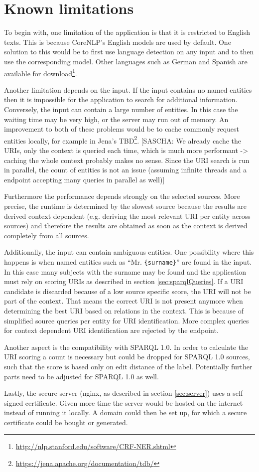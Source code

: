 \section{Known limitations}
\label{sec:Limits}
To begin with, one limitation of the application is that it is restricted to English texts. This is because CoreNLP's English models are used by default. One solution to this would be to first use language detection on any input and to then use the corresponding model. Other languages such as German and Spanish are available for download\footnote{\url{http://nlp.stanford.edu/software/CRF-NER.shtml}}. 

Another limitation depends on the input. If the input contains no named entities then it is impossible for the application to search for additional information. Conversely, the input can contain a large number of entities. In this case the waiting time may be very high, or the server may run out of memory. An improvement to both of these problems would be to cache commonly request entities locally, for example in Jena's TBD\footnote{\url{https://jena.apache.org/documentation/tdb/}}. [SASCHA: We already cache the URIs, only the context is queried each time, which is much more performant -> caching the whole context probably makes no sense. Since the URI search is run in parallel, the count of entities is not an issue (assuming infinite threads and a endpoint accepting many queries in parallel as well)]  

Furthermore the performance depends strongly on the selected sources. More precise, the runtime is determined by the slowest source because the results are derived context dependent (e.g. deriving the most relevant URI per entity across sources) and therefore the results are obtained as soon as the context is derived completely from all sources. 

Additionally, the input can contain ambiguous entities. One possibility where this happens is when named entities such as ``Mr. \texttt{\{surname\}}'' are found in the input. In this case many subjects with the surname may be found and the application must rely on scoring URIs as described in section \ref{sec:sparqlQueries}. If a URI candidate is discarded because of a low source specific score, the URI will not be part of the context. That means the correct URI is not present anymore when determining the best URI based on relations in the context. This is because of simplified source queries per entity for URI identification. More complex queries for context dependent URI identification are rejected by the endpoint.

Another aspect is the compatibility with SPARQL 1.0. In order to calculate the URI scoring a count is necessary but could be dropped for SPARQL 1.0 sources, such that the score is based only on edit distance of the label. Potentially further parts need to be adjusted for SPARQL 1.0 as well. 

Lastly, the secure server (nginx, as described in section \ref{sec:server}) uses a self signed certificate. Given more time the server would be hosted on the internet instead of running it locally. A domain could then be set up, for which a secure certificate could be bought or generated. 




